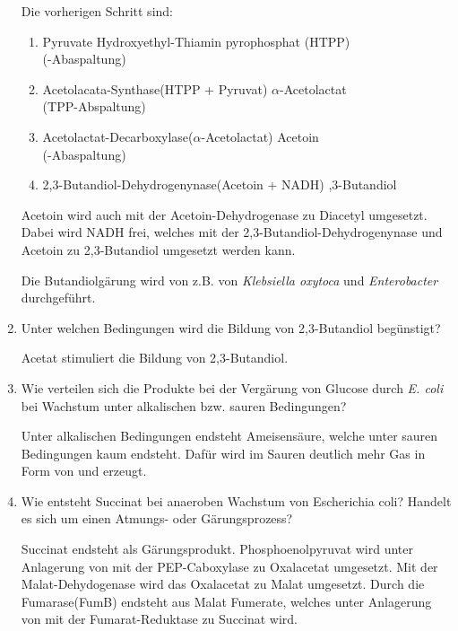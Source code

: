 \begin{enumerate}
		Die vorherigen Schritt sind:
		\begin{enumerate}[label=\arabic*)]
			\item Pyruvate \textrightarrow Hydroxyethyl-Thiamin pyrophosphat (HTPP)	\\
			\hfill(-Abaspaltung)
			\item Acetolacata-Synthase(HTPP + Pyruvat) \textrightarrow \begin{math}\alpha\end{math}-Acetolactat \\
			\hfill(TPP-Abspaltung)
			\item Acetolactat-Decarboxylase(\begin{math}\alpha\end{math}-Acetolactat) \textrightarrow Acetoin \\
			\hfill(-Abaspaltung)
			\item 2,3-Butandiol-Dehydrogenynase(Acetoin + NADH) ,3-Butandiol
		\end{enumerate}
		Acetoin wird auch mit der Acetoin-Dehydrogenase zu Diacetyl umgesetzt.
		Dabei wird NADH frei, 
		welches mit der 2,3-Butandiol-Dehydrogenynase und Acetoin zu 2,3-Butandiol umgesetzt werden kann.

		Die Butandiolgärung wird von z.B. von \emph{Klebsiella oxytoca} und \emph{Enterobacter} durchgeführt.

	\item Unter welchen Bedingungen wird die Bildung von 2,3-Butandiol begünstigt?
	
		Acetat stimuliert die Bildung von 2,3-Butandiol.

	\item Wie verteilen sich die Produkte bei der Vergärung von Glucose durch \emph{E. coli} bei Wachstum unter alkalischen bzw. sauren Bedingungen?
		
		Unter alkalischen Bedingungen endsteht Ameisensäure,
		welche unter sauren Bedingungen kaum endsteht.
		Dafür wird im Sauren deutlich mehr Gas in Form von  und  erzeugt.

	\item Wie entsteht Succinat bei anaeroben Wachstum von Escherichia coli? Handelt es sich um einen Atmungs- oder Gärungsprozess?
		
		Succinat endsteht als Gärungsprodukt.
		Phosphoenolpyruvat wird unter Anlagerung von  mit der PEP-Caboxylase zu Oxalacetat umgesetzt.
		Mit der Malat-Dehydogenase wird das Oxalacetat zu Malat umgesetzt.
		Durch die Fumarase(FumB) endsteht aus Malat Fumerate,
		welches unter Anlagerung von  mit der Fumarat-Reduktase zu Succinat wird.
\end{enumerate}
